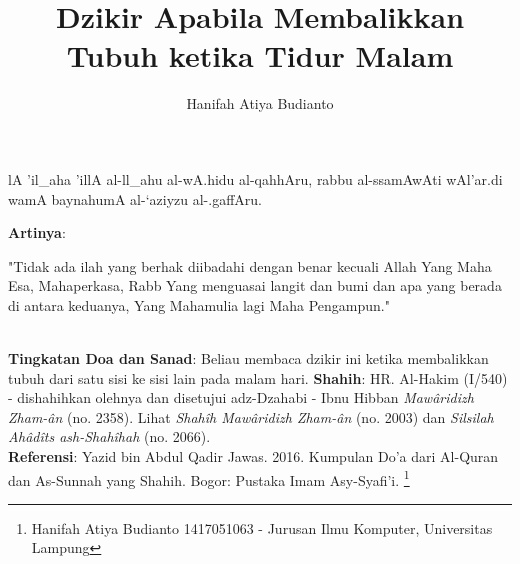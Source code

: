 \documentclass[a4paper,12pt]{article}
\title{\Large Dzikir Apabila Membalikkan Tubuh ketika Tidur Malam}
\author{\calligra Hanifah Atiya Budianto}
\begin{document}
\sffamily
\maketitle 
\fullvocalize
{}
\begin{arabtext}
\noindent
lA 'il_aha 'illA al-ll_ahu al-wA.hidu al-qahhAru, rabbu al-ssamAwAti
wAl'ar.di wamA baynahumA al-`aziyzu al-.gaffAru.\\
\end{arabtext}
\noindent
\textbf{Artinya}:
\par
\indent
"Tidak ada ilah yang berhak diibadahi dengan benar kecuali Allah Yang Maha
Esa, Mahaperkasa, Rabb Yang menguasai langit dan bumi dan apa yang berada 
di antara keduanya, Yang Mahamulia lagi Maha Pengampun." \\\\
\par
\noindent
\textbf{Tingkatan Doa dan Sanad}: Beliau membaca dzikir ini ketika 
membalikkan tubuh dari satu sisi ke sisi lain pada malam hari.
\textbf{Shahih}: HR. Al-Hakim (I/540) - dishahihkan olehnya dan disetujui
adz-Dzahabi - Ibnu Hibban \textit{Maw\^{a}ridizh Zham-\^{a}n} (no. 2358). 
Lihat \textit{Shah\^{i}h Maw\^{a}ridizh Zham-\^{a}n} (no. 2003) dan
\textit{Silsilah Ah\^{a}d\^{i}ts ash-Shah\^{i}hah} (no. 2066).\\
\textbf{Referensi}: Yazid bin Abdul Qadir Jawas. 2016. Kumpulan Do'a dari
Al-Quran dan As-Sunnah yang Shahih. Bogor: Pustaka Imam Asy-Syafi'i.
\footnote{Hanifah Atiya Budianto 1417051063 - Jurusan Ilmu Komputer,
Universitas Lampung}
\end{document}
